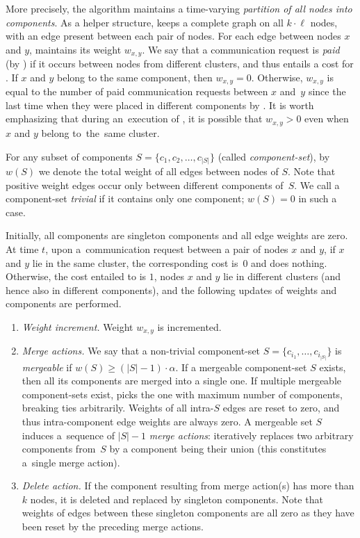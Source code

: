 More precisely, the algorithm maintains a time-varying \emph{partition of all
nodes into components}. As a helper structure, \CREP keeps a complete graph on
all $k \cdot \ell$ nodes, with an edge present between each pair of nodes. For
each edge between nodes $x$ and $y$, \CREP maintains its weight $w_{x,y}$. We
say that a communication request is \emph{paid} (by \CREP) if it occurs
between nodes from different clusters, and thus entails a cost for \CREP. If
$x$ and $y$ belong to the same component, then $w_{x,y} = 0$. Otherwise,
$w_{x,y}$ is equal to the number of paid communication requests between $x$
and~$y$ since the last time when they were placed in different components by
\CREP. It is worth emphasizing that during an~execution of \CREP, it is
possible that $w_{x,y} > 0$ even when $x$ and $y$ belong to~the~same cluster.

For any subset of components $S = \{ c_1, c_2, \ldots, c_{|S|} \}$ (called
\emph{component-set}), by $w(S)$ we denote the total weight of all edges
between nodes of $S$. Note that positive weight edges occur only between
different components of~$S$. We call a component-set \emph{trivial} if it
contains only one component; $w(S) = 0$ in such a case.

Initially, all components are singleton components and all edge weights are
zero. At time $t$, upon a~communication request between a pair of nodes $x$
and $y$, if $x$ and $y$ lie in the same cluster, the corresponding cost is~$0$
and \CREP does nothing. Otherwise, the cost entailed to \CREP is $1$, nodes
$x$ and $y$ lie in different clusters (and hence also in different
components), and the following updates of weights and components are
performed.

\begin{enumerate}

\item \emph{Weight increment.} Weight $w_{x,y}$ is incremented.

\item \emph{Merge actions.} We say that a non-trivial component-set $S = \{
c_{i_1}, \ldots, c_{i_{|S|}} \}$ is \emph{mergeable} if $w(S) \geq
(|S|-1) \cdot \alpha$. If a mergeable component-set $S$ exists, then all its
components are merged into a single one. If multiple mergeable component-sets
exist, \CREP picks the one with maximum number of components, breaking ties
arbitrarily. Weights of all intra-$S$ edges are reset to zero, and thus
intra-component edge weights are always zero. A mergeable set $S$ induces
a~sequence of $|S|-1$ \emph{merge actions}:
\CREP iteratively replaces two arbitrary components 
from~$S$ by a component being their union (this constitutes a~single merge
action).

\item \emph{Delete action.} If the component resulting from merge action(s)
has more than $k$ nodes, it is deleted and replaced by singleton
components. Note that weights of edges between these singleton components are
all zero as they have been reset by the preceding merge actions.

\end{enumerate}

